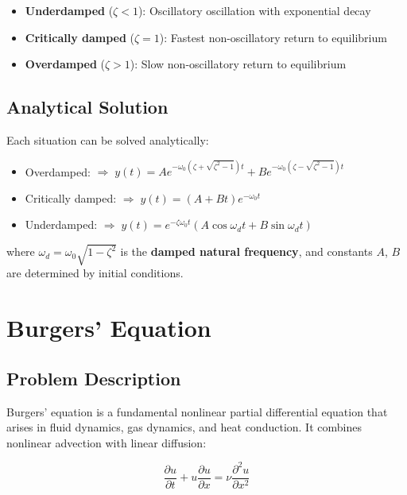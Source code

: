 \documentclass[12pt, a4paper]{report}
\newcommand{\pd}[2]{\frac{\partial #1}{\partial #2}}
\newcommand{\pdd}[2]{\frac{\partial^2 #1}{\partial #2^2}}
\begin{document}
\begin{itemize}
    \item \textbf{Underdamped} ($\zeta < 1$): Oscillatory oscillation with exponential decay
    \item \textbf{Critically damped} ($\zeta = 1$): Fastest non-oscillatory return to equilibrium
    \item \textbf{Overdamped} ($\zeta > 1$): Slow non-oscillatory return to equilibrium
\end{itemize}

\subsection{Analytical Solution}
Each situation can be solved analytically:
\begin{itemize}
    \item Overdamped: $\Rightarrow\; 
    y(t) = Ae^{-\omega_0(\zeta + \sqrt{\zeta^2-1})t}
    + Be^{-\omega_0(\zeta - \sqrt{\zeta^2-1})t}$

    \item Critically damped: $\Rightarrow\; 
    y(t) = (A + Bt)e^{-\omega_0 t}$

    \item Underdamped: $\Rightarrow\; 
    y(t) = e^{-\zeta \omega_0 t}
    \left(A\cos \omega_d t + B\sin \omega_d t\right)$
\end{itemize}
where $\omega_d = \omega_0 \sqrt{1 - \zeta^2}$ is the \textbf{damped natural frequency}, and constants $A$, $B$ are determined by initial conditions.


\section{Burgers' Equation}

\subsection{Problem Description}

Burgers' equation is a fundamental nonlinear partial differential equation that arises in fluid dynamics, gas dynamics, and heat conduction. It combines nonlinear advection with linear diffusion:

\begin{equation}
\pd{u}{t} + u \pd{u}{x} = \nu \pdd{u}{x}
\label{eq:burgers}
\end{equation}
\end{document}
